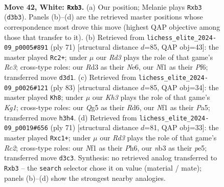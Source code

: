 \documentclass[11pt]{article}
\begin{document}
\clearpage

\begin{figure}[p]\centering
\begin{subfigure}{0.46\textwidth}\centering
\resizebox{\linewidth}{!}{%
\newchessgame
\chessboard[
  setfen={r5r1/p5pp/2kb4/3p2QP/p2P2P1/1n1RP2K/2q5/5N2 w - - 5 42},
  showmover=false,
  pgfstyle=straightmove, color=movearrow, markmove={d3-b3}
]}
\caption{}
\end{subfigure}\hfill
\begin{subfigure}{0.46\textwidth}\centering
\resizebox{\linewidth}{!}{%
\newchessgame
\chessboard[
  setfen={7k/p2q2p1/1prPnp1p/3Q4/P6P/4B1P1/1P4K1/3R4 b - - 2 36},
  showmover=false,
  pgfstyle=straightmove, color=movearrow, markmove={c6-c2}
]}
\caption{}
\end{subfigure}
\\[4pt]
\begin{subfigure}{0.46\textwidth}\centering
\resizebox{\linewidth}{!}{%
\newchessgame
\chessboard[
  setfen={6k1/6p1/1p1r3p/p2Pqp1P/P2R4/3Q2P1/5P2/6K1 b - - 0 42},
  showmover=false,
  pgfstyle=straightmove, color=movearrow, markmove={g8-h8}
]}
\caption{}
\end{subfigure}\hfill
\begin{subfigure}{0.46\textwidth}\centering
\resizebox{\linewidth}{!}{%
\newchessgame
\chessboard[
  setfen={5Q2/qpr3pk/4p2p/P2pPp1P/3P4/8/1n3PP1/R1R3K1 b - - 10 36},
  showmover=false,
  pgfstyle=straightmove, color=movearrow, markmove={c7-c1}
]}
\caption{}
\end{subfigure}
\caption{\textbf{Move 42, White: \texttt{Rxb3}.} (a) Our position; Melanie plays \texttt{Rxb3} (\texttt{d3b3}). Panels (b)--(d) are the retrieved master positions whose correspondence most drove this move (highest QAP objective among those that transfer to it). (b) Retrieved from \texttt{lichess\_elite\_2024-09\_p0005\#891} (ply 71) [structural distance $d$=85, QAP obj=43]: the master played \texttt{Rc2+}; under $\mu$ our \emph{Rd3} plays the role of that game's \emph{Rc3}; cross-type roles: our \emph{R}d3 as their \emph{N}e6, our \emph{N}f1 as their \emph{P}f6; transferred move \texttt{d3d1}. (c) Retrieved from \texttt{lichess\_elite\_2024-09\_p0026\#121} (ply 83) [structural distance $d$=85, QAP obj=34]: the master played \texttt{Kh8}; under $\mu$ our \emph{Kh3} plays the role of that game's \emph{Kg1}; cross-type roles: our \emph{Q}g5 as their \emph{R}d6, our \emph{N}f1 as their \emph{P}a5; transferred move \texttt{h3h4}. (d) Retrieved from \texttt{lichess\_elite\_2024-09\_p0019\#656} (ply 71) [structural distance $d$=81, QAP obj=33]: the master played \texttt{Rxc1+}; under $\mu$ our \emph{Rd3} plays the role of that game's \emph{Rc2}; cross-type roles: our \emph{N}f1 as their \emph{P}h6, our \emph{n}b3 as their \emph{p}e5; transferred move \texttt{d3c3}. Synthesis: no retrieved analog transferred to \texttt{Rxb3} -- the \texttt{search} selector chose it on value (material / mate); panels (b)--(d) show the strongest nearby analogies.}
\label{fig:thought-m82}
\end{figure}
\end{document}
